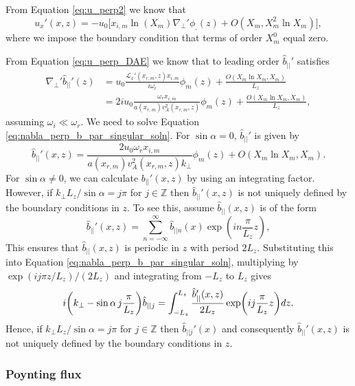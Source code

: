 \documentclass[linenumbers]{aastex63}
\begin{document}
From Equation \eqref{eq:u_perp2} we know that
\begin{equation}
    \label{eq:ux_singular_soln}
    u_x'(x,z) = -u_0\Big[x_{i,m}\ln(X_m)\nabla_\perp'\phi_,(z) + O(X_m,X_m^2\ln X_m)\Big],
\end{equation}
where we impose the boundary condition that terms of order $X_m^0$ equal zero.

From Equation \eqref{eq:u_perp_DAE} we know that to leading order $\hat{b}_{||}'$ satisfies
\begin{equation}
    \label{eq:nabla_perp_b_par_singular_soln}
    \begin{aligned}
   \nabla_\perp' \hat{b}_{||}'(z) &= u_0\frac{\mathcal{L}_x'(x_{r,m},z)x_{i,m}}{i\omega_r}\phi_m(z) + \frac{O(X_m\ln X_m, X_m)}{L_z} \\
   &= 2iu_0\frac{\omega_r x_{i,m}}{a(x_{r,m})v_A^2(x_{r,m},z)}\phi_m(z) + \frac{O(X_m\ln X_m, X_m)}{L_z},
   \end{aligned}
\end{equation}
assuming $\omega_i\ll\omega_r$. We need to solve Equation \eqref{eq:nabla_perp_b_par_singular_soln}. For $\sin\alpha=0$, $\hat{b}_{||}'$ is given by
\begin{equation}
    \hat{b}_{||}'(x,z) = \frac{2u_0\omega_r x_{i,m}}{a(x_{r,m})v_A^2(x_{r,m},z)k_\perp}\phi_m(z) +  O(X_m\ln X_m, X_m).
\end{equation}
For $\sin\alpha\ne0$, we can calculate $b_{||}'(x,z)$ by using an integrating factor. However, if $k_\perp L_z / \sin\alpha = j\pi$ for $j\in\mathds{Z}$ then $\hat{b}_{||}'(x,z)$ is not uniquely defined by the boundary conditions in $z$. To see this, assume $\hat{b}_{||}(x,z)$ is of the form
\[\hat{b}_{||}'(x,z) = \sum_{n=-\infty}^\infty \hat{b}_{||n}(x)\exp(in\frac{\pi}{L_z}z),\]
This ensures that $\hat{b}_{||}(x,z)$ is periodic in $z$ with period $2L_z$. Substituting this into Equation \eqref{eq:nabla_perp_b_par_singular_soln}, multiplying by
$\exp(ij\pi z / L_z) / (2 L_z)$ and integrating from $-L_z$ to $L_z$ gives
\[i\qty(k_\perp - \sin\alpha\, j\frac{\pi}{L_z})\hat{b}_{|| j} = \int_{-L_z}^{L_z}\frac{\hat{b}_{||}'(x,z)}{2L_z}\exp(ij\frac{\pi}{L_z}z)dz.\]
Hence, if $k_\perp L_z / \sin\alpha = j\pi$ for $j\in\mathds{Z}$ then $\hat{b}_{||j}'(x)$ and consequently $\hat{b}_{||}'(x,z)$ is not uniquely defined by the boundary conditions in $z$. 

\subsubsection{Poynting flux}
\end{document}
